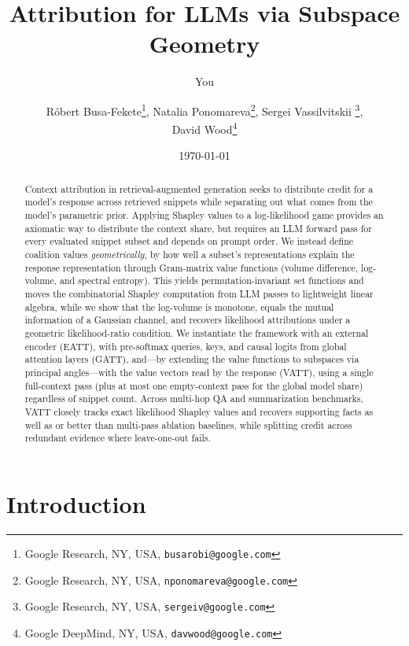 \documentclass{article}
\title{Attribution for LLMs via Subspace Geometry}
\author{You}
\date{\today}
\author{R\'{o}bert Busa-Fekete\footnote{Google Research, NY, USA, \texttt{busarobi@google.com}}, Natalia Ponomareva\footnote{Google Research, NY, USA, \texttt{nponomareva@google.com}}, Sergei Vassilvitskii \footnote{Google Research, NY, USA, \texttt{sergeiv@google.com}},\\ 
David Wood\footnote{Google DeepMind, NY, USA, \texttt{davwood@google.com}}}
\begin{document}
\maketitle

\begin{abstract}
Context attribution in retrieval-augmented generation seeks to distribute credit for a model's response across retrieved snippets while separating out what comes from the model's parametric prior. Applying Shapley values to a log-likelihood game provides an axiomatic way to distribute the context share, but requires an LLM forward pass for every evaluated snippet subset and depends on prompt order. We instead define coalition values \emph{geometrically}, by how well a subset's representations explain the response representation through Gram-matrix value functions (volume difference, log-volume, and spectral entropy). This yields permutation-invariant set functions and moves the combinatorial Shapley computation from LLM passes to lightweight linear algebra, while we show that the log-volume is monotone, equals the mutual information of a Gaussian channel, and recovers likelihood attributions under a geometric likelihood-ratio condition. We instantiate the framework with an external encoder (EATT), with pre-softmax queries, keys, and causal logits from global attention layers (GATT), and---by extending the value functions to subspaces via principal angles---with the value vectors read by the response (VATT), using a single full-context pass (plus at most one empty-context pass for the global model share) regardless of snippet count. Across multi-hop QA and summarization benchmarks, VATT closely tracks exact likelihood Shapley values and recovers supporting facts as well as or better than multi-pass ablation baselines, while splitting credit across redundant evidence where leave-one-out fails.
\end{abstract}

\section{Introduction}
\label{sec:introduction}
\end{document}
